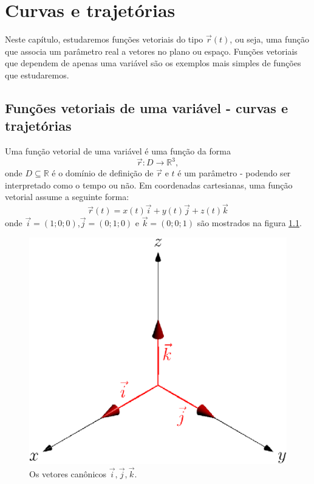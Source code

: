 
\chapter{Curvas e trajetórias}
  Neste capítulo, estudaremos funções vetoriais do tipo $\vec{r}(t)$, ou seja, uma função que associa um parâmetro real a vetores no plano ou espaço. Funções vetoriais que dependem de apenas uma variável são os exemplos mais simples de funções que estudaremos. 

\section{Funções vetoriais de uma variável - curvas e trajetórias}
Uma função vetorial de uma variável é uma função da forma $$\vec{r}:D\to \mathbb{R}^3,$$ onde $D\subseteq \mathbb{R}$ é o domínio de definição de $\vec{r}$ e $t$ é um parâmetro - podendo ser interpretado como o tempo ou não. Em coordenadas cartesianas, uma função vetorial assume a seguinte forma:
$$\vec{r}(t)=x(t)\vec{i}+y(t)\vec{j}+z(t)\vec{k}$$
onde $\vec{i}=(1;0;0)$,$\vec{j}=(0;1;0)$ e $\vec{k}=(0;0;1)$ são mostrados na figura \ref{fig_vetijk}.

\begin{figure} \label{fig_vetijk}
\begin{center}
    \includegraphics{./cap_curvas/figs/vetores_ijk}
 \caption{Os vetores canônicos $\vec{i},\vec{j},\vec{k}$.}
  \end{center}
\end{figure}

